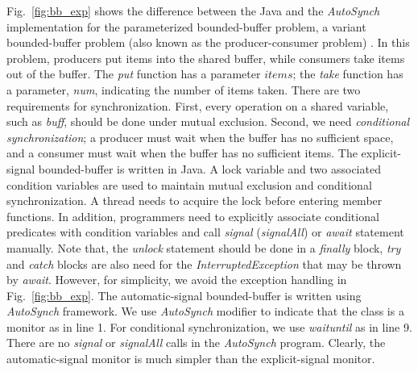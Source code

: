\documentclass{sigplanconf}
\begin{document}

Fig.~\ref{fig:bb_exp} shows the difference between 
the Java and the {\em AutoSynch} implementation for the parameterized bounded-buffer
problem, a variant bounded-buffer problem (also known as the producer-consumer problem) \cite{dijk65, dijk71}. 
In this problem, producers put items into the shared buffer, while 
consumers take items out of the buffer. The {\em put} function has a parameter
$items$; the {\em take} function has a parameter, {\em num}, 
indicating the number of items taken. There are two requirements for synchronization.
First, every operation on a shared variable, such as {\em buff}, should be done 
under mutual exclusion. Second, we need {\em conditional synchronization};
a producer must wait when the buffer has no sufficient space, and a consumer 
must wait when the buffer has no sufficient items. The explicit-signal 
bounded-buffer is written in Java. A lock variable and two associated condition 
variables are used to maintain mutual exclusion and conditional 
synchronization. A thread needs to acquire the lock before entering member
functions. In addition, programmers need to explicitly associate conditional 
predicates with condition variables and call {\em signal} ({\em signalAll}) or
{\em await} statement manually. Note that, the {\em unlock} statement should be 
done in a {\em finally} block, {\em try} and {\em catch} blocks are also need for the 
{\em InterruptedException} that may be thrown by {\em await}. However, for
simplicity, we avoid the exception handling in Fig.~\ref{fig:bb_exp}. 
The automatic-signal bounded-buffer is written using {\em AutoSynch} framework.
We use {\em AutoSynch} modifier to indicate that the class is a monitor as in line 
1. For conditional synchronization,  we use {\em waituntil} as in line 9. There are 
no {\em signal} or {\em signalAll} calls in the {\em AutoSynch} program.
Clearly, the automatic-signal monitor is
much simpler than the explicit-signal monitor. 
\end{document}
